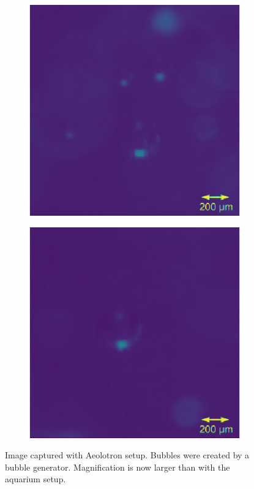 			\begin{figure}
				\begin{subfigure}[t]{.55\textwidth}
				\centering
				\includegraphics[scale=0.45]{images/aeolotron_result_small_1.png}
				\caption{}
				\label{subfig:aquarium_result_sat}
			\end{subfigure}\hfill
			\begin{subfigure}[t]{.55\textwidth}
				\centering
				\includegraphics[scale=0.45]{images/aeolotron_result_small_2.png}
				\caption{}
			\end{subfigure}
				\caption{Image captured with Aeolotron setup. Bubbles were created by a bubble generator. Magnification is now larger than with the aquarium setup.}
								
				\label{fig:aeolotron_result}
			\end{figure}
	

